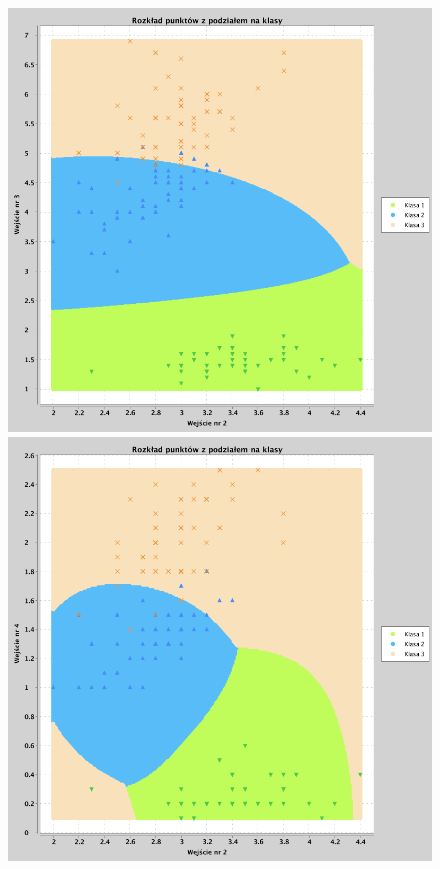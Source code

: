 \documentclass[a4paper, portrait,11pt]{article}
\begin{document}
\begin{figure}[!htb]
  \begin{minipage}{0.33\textwidth}
    \centering
    \includegraphics[width=1\linewidth]{../data/classification4/3/2_2,3.png}
    \caption{\label{fig:43_2_2,3}}
  \end{minipage}
  \begin{minipage}{0.33\textwidth}
    \centering
    \includegraphics[width=1\linewidth]{../data/classification4/3/2_2,4.png}

\end{minipage}
\end{figure}
\end{document}
